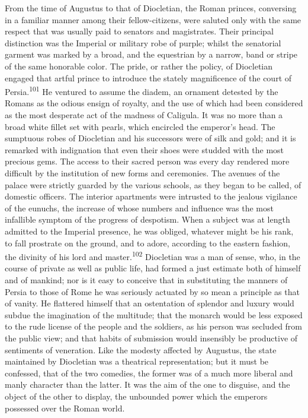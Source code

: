 From the time of Augustus to that of Diocletian, the Roman
princes, conversing in a familiar manner among their
fellow-citizens, were saluted only with the same respect that was
usually paid to senators and magistrates. Their principal
distinction was the Imperial or military robe of purple; whilst
the senatorial garment was marked by a broad, and the equestrian
by a narrow, band or stripe of the same honorable color. The
pride, or rather the policy, of Diocletian engaged that artful
prince to introduce the stately magnificence of the court of
Persia.\textsuperscript{101} He ventured to assume the diadem, an ornament
detested by the Romans as the odious ensign of royalty, and the
use of which had been considered as the most desperate act of the
madness of Caligula. It was no more than a broad white fillet set
with pearls, which encircled the emperor’s head. The sumptuous
robes of Diocletian and his successors were of silk and gold; and
it is remarked with indignation that even their shoes were
studded with the most precious gems. The access to their sacred
person was every day rendered more difficult by the institution
of new forms and ceremonies. The avenues of the palace were
strictly guarded by the various schools, as they began to be
called, of domestic officers. The interior apartments were
intrusted to the jealous vigilance of the eunuchs, the increase
of whose numbers and influence was the most infallible symptom of
the progress of despotism. When a subject was at length admitted
to the Imperial presence, he was obliged, whatever might be his
rank, to fall prostrate on the ground, and to adore, according to
the eastern fashion, the divinity of his lord and master.\textsuperscript{102}
Diocletian was a man of sense, who, in the course of private as
well as public life, had formed a just estimate both of himself
and of mankind; nor is it easy to conceive that in substituting
the manners of Persia to those of Rome he was seriously actuated
by so mean a principle as that of vanity. He flattered himself
that an ostentation of splendor and luxury would subdue the
imagination of the multitude; that the monarch would be less
exposed to the rude license of the people and the soldiers, as
his person was secluded from the public view; and that habits of
submission would insensibly be productive of sentiments of
veneration. Like the modesty affected by Augustus, the state
maintained by Diocletian was a theatrical representation; but it
must be confessed, that of the two comedies, the former was of a
much more liberal and manly character than the latter. It was the
aim of the one to disguise, and the object of the other to
display, the unbounded power which the emperors possessed over
the Roman world.

